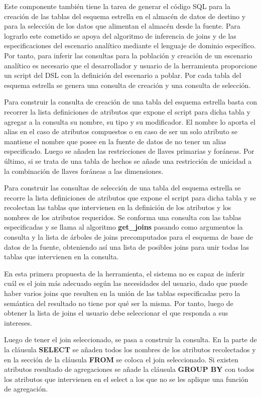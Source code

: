 Este componente también tiene la tarea de generar el código SQL para la creación de las 
tablas del esquema estrella en el almacén de datos de destino y para la selección de 
los datos que alimentan el almacén desde la fuente. Para lograrlo este cometido se apoya 
del algoritmo de inferencia de joins y de las especificaciones del escenario analítico 
mediante el lenguaje de dominio específico. Por tanto, para inferir las consultas para 
la población y creación de un escenario analítico es necesario que el desarrollador y 
usuario de la herramienta proporcione un script del DSL con la definición del escenario 
a poblar. Por cada tabla del esquema estrella se genera una consulta de creación y una 
consulta de selección.

Para construir la consulta de creación de una tabla del esquema estrella basta con recorrer 
la lista definiciones de atributos que expone el script para dicha tabla y agregar a la consulta 
su nombre, su tipo y su modificador. 
El nombre lo aporta el alias en el caso de atributos compuestos o en caso de ser un solo atributo 
se mantiene el nombre que posee en la fuente de datos de no tener un alias especificado. Luego se 
añaden las restricciones de llaves primarias y for\'aneas. Por \'ultimo, si se trata de una tabla 
de hechos se añade una restricción de unicidad a la combinación de llaves for\'aneas a las 
dimensiones.

Para construir las consultas de selección de una tabla del esquema estrella se recorre la 
lista definiciones de atributos que expone el script para dicha tabla y se recolectan las 
tablas que intervienen en la definición de los atributos y los nombres de los atributos requeridos.
Se conforma una consulta con las tablas especificadas y se llama al algoritmo \textbf{get\_joins} 
pasando como argumentos la consulta y la lista de \'arboles de joins precomputados para el esquema 
de base de datos de la fuente, obteniendo as\'i una lista de posibles joins para unir todas las 
tablas que intervienen en la consulta.

En esta primera propuesta de la herramienta, el sistema no es capaz de inferir cu\'al es el join 
m\'as adecuado según las necesidades del usuario, dado que puede haber varios joins que resulten 
en la uni\'on de las tablas especificadas pero la semántica del resultado no tiene por qu\'e ser 
la misma. Por tanto, luego de obtener la lista de joins el usuario debe seleccionar el que responda 
a sus intereses.

Luego de tener el join seleccionado, se pasa a construir la consulta. En la parte de la cláusula 
\textbf{SELECT} se añaden todos los nombres de los atributos recolectados y en la sección de la cláusula 
\textbf{FROM} se coloca el join seleccionado. Si existen atributos resultado de agregaciones se añade 
la cláusula \textbf{GROUP BY} con todos los atributos que intervienen en el select a los que no 
se les aplique una función de agregación.


